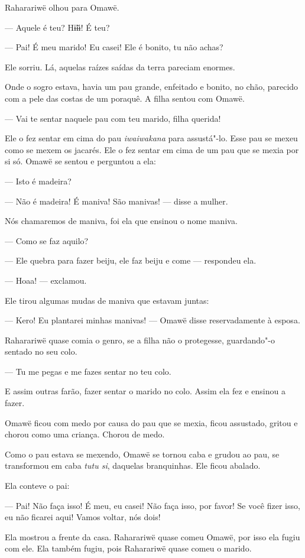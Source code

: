 Raharariwë olhou para Omawë. 

--- Aquele é teu? Hɨ̃ɨɨ! É teu?

--- Pai! É meu marido! Eu casei! Ele é bonito, tu não achas? 

Ele sorriu. Lá, aquelas raízes saídas da terra pareciam enormes.

Onde o sogro estava, havia um pau grande, enfeitado e bonito, no chão,
parecido com a pele das costas de um poraquê. A filha sentou com Omawë.

--- Vai te sentar naquele pau com teu marido, filha
querida! 

Ele o fez sentar em cima do pau \emph{iwaiwakana} para assustá"-lo. Esse
pau se mexeu como se mexem os jacarés. Ele o fez sentar em cima de um
pau que se mexia por si só. Omawë se sentou e perguntou a ela: 

--- Isto é madeira?

--- Não é madeira! É maniva! São manivas! --- disse a mulher. 

Nós chamaremos de maniva, foi ela que ensinou o nome maniva. 

--- Como se faz aquilo? 

--- Ele quebra para fazer beiju, ele faz beiju e come --- respondeu
ela. 

--- Hoaa! --- exclamou. 

Ele tirou algumas mudas de maniva que estavam juntas:

--- Kero! Eu plantarei minhas manivas! --- Omawë disse reservadamente à esposa. 

Raharariwë quase comia o genro, se a filha não o protegesse,
guardando"-o sentado no seu colo. 

--- Tu me pegas e me fazes sentar no teu colo. 

E assim outras farão, fazer sentar o marido no colo. Assim ela fez e
ensinou a fazer. 

Omawë ficou com medo por causa do pau que se mexia, ficou assustado,
gritou e chorou como uma criança. Chorou de medo. 

Como o pau estava se mexendo, Omawë se tornou caba e grudou ao pau, se
transformou em caba \emph{tutu si}, daquelas branquinhas. Ele ficou
abalado. 

Ela conteve o pai: 

--- Pai! Não faça isso! É meu, eu casei! Não faça isso, por favor! Se
você fizer isso, eu não ficarei aqui! Vamos voltar, nós dois!

Ela mostrou a frente da casa. Raharariwë quase comeu Omawë, por isso ela
fugiu com ele. Ela também fugiu, pois Raharariwë quase comeu o marido. 

